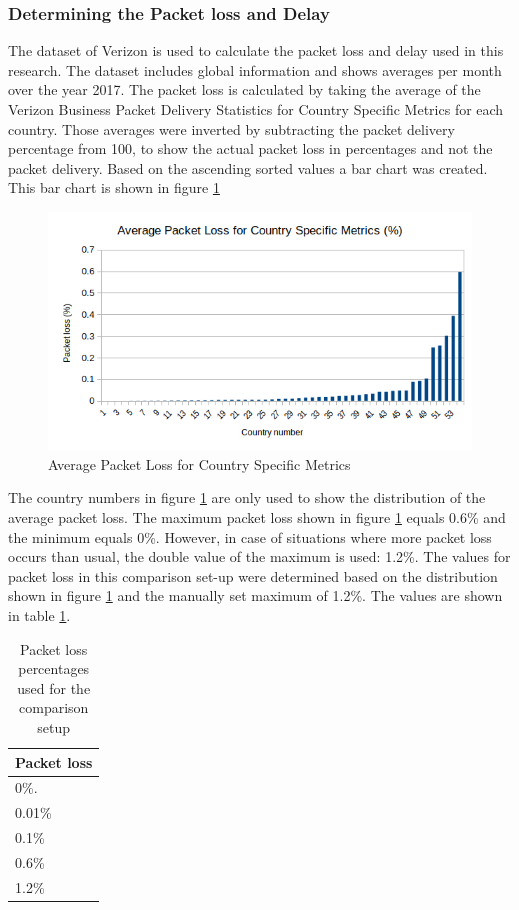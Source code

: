 \documentclass{article}
\begin{document}
		\subsubsection{Determining the Packet loss and Delay}
		The dataset of Verizon \cite{verizon-latency} is used to calculate the packet loss and delay used in this research. The dataset includes global information and shows averages per month over the year 2017. The packet loss is calculated by taking the average of the Verizon Business Packet Delivery Statistics for Country Specific Metrics for each country. Those averages were inverted by subtracting the packet delivery percentage from 100, to show the actual packet loss in percentages and not the packet delivery. Based on the ascending sorted values a bar chart was created. This bar chart is shown in figure \ref{fig:packet-loss-chart}
		
	\begin{figure}[H] 
		\centering
  			\includegraphics[scale=0.7]{figs/verizon-packetloss.png}
  			\caption{Average Packet Loss for Country Specific Metrics}
  		\label{fig:packet-loss-chart}
	\end{figure}

The country numbers in figure \ref{fig:packet-loss-chart} are only used to show the distribution of the average packet loss. The maximum packet loss shown in figure \ref{fig:packet-loss-chart} equals 0.6\% and the minimum equals 0\%. However, in case of situations where more packet loss occurs than usual, the double value of the maximum is used: 1.2\%. The values for packet loss in this comparison set-up were determined based on the distribution shown in figure \ref{fig:packet-loss-chart} and the manually set maximum of 1.2\%. The values are shown in table \ref{table:test-packetloss}.	
	
	\begin{table}[H]
		\centering
		\caption{Packet loss percentages used for the comparison setup}
		\begin{tabular}[H]{ | l |}
		\hline
		\textbf{Packet loss} \\
		\hline 0\%. \\
		\hline 0.01\% \\
		\hline 0.1\% \\
		\hline 0.6\% \\
		\hline 1.2\% \\
		\hline
		\end{tabular}
		\label{table:test-packetloss}
	\end{table}
\end{document}
